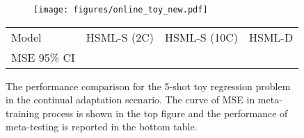 \documentclass{article}
\begin{document}
\begin{figure}[h]
	\centering
	\begin{subfigure}[b]{0.9\linewidth}
	\centering
		\texttt{[image: figures/online\_toy\_new.pdf]}
	\end{subfigure}
	\begin{subtable}{0.95\linewidth}
	\scriptsize 
        \centering
        \begin{tabular}{lccc}
        \hline
           Model & HSML-S (2C) & HSML-S (10C) & HSML-D  \\
           MSE  95\% CI &  &  & \\\hline
        \end{tabular}
    \end{subtable}  
	\caption{The performance comparison for the 5-shot toy regression problem in the continual adaptation scenario. The curve of MSE in meta-training process is shown in the top figure and the performance of meta-testing is reported in the bottom table.}
	\label{fig:sync_online}
\end{figure}
\end{document}
